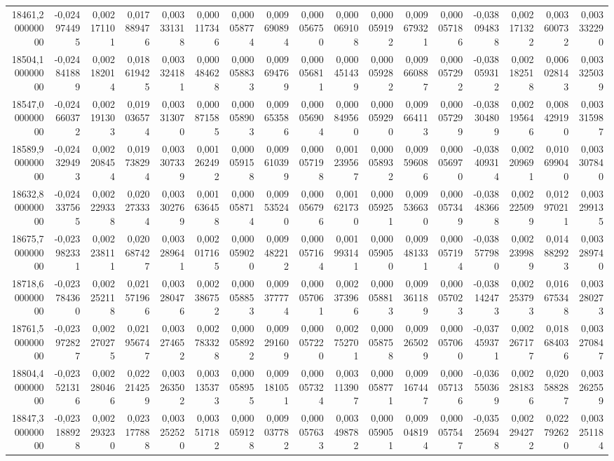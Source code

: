 \begin{longtable}{rrrrrrrrrrrrrrrrr}
18461,200000000 & -0,024974495 & 0,002171101 & 0,017889476 & 0,003331318 & 0,000117346 & 0,000058774 & 0,009690894 & 0,000056750 & 0,000069108 & 0,000059192 & 0,009679321 & 0,000057186 & -0,038094838 & 0,002171322 & 0,003600732 & 0,003332290\\
18504,100000000 & -0,024841889 & 0,002182014 & 0,018619425 & 0,003324181 & 0,000484628 & 0,000058833 & 0,009694769 & 0,000056811 & 0,000451439 & 0,000059282 & 0,009660887 & 0,000057292 & -0,038059312 & 0,002182518 & 0,006028143 & 0,003325039\\
18547,000000000 & -0,024660372 & 0,002191303 & 0,019036574 & 0,003313070 & 0,000871585 & 0,000058903 & 0,009653586 & 0,000056904 & 0,000849560 & 0,000059290 & 0,009664113 & 0,000057299 & -0,038304809 & 0,002195646 & 0,008429190 & 0,003315987\\
18589,900000000 & -0,024329493 & 0,002208454 & 0,019738294 & 0,003307339 & 0,001262492 & 0,000059158 & 0,009610399 & 0,000057198 & 0,001239567 & 0,000058932 & 0,009596086 & 0,000056970 & -0,038409314 & 0,002209691 & 0,010699040 & 0,003307840\\
18632,800000000 & -0,024337565 & 0,002229338 & 0,020273334 & 0,003302769 & 0,001636458 & 0,000058714 & 0,009535240 & 0,000056796 & 0,001621730 & 0,000059251 & 0,009536630 & 0,000057349 & -0,038483668 & 0,002225099 & 0,012970211 & 0,003299135\\
18675,700000000 & -0,023982331 & 0,002238111 & 0,020687427 & 0,003289641 & 0,002017165 & 0,000059020 & 0,009482212 & 0,000057164 & 0,001993141 & 0,000059050 & 0,009481331 & 0,000057194 & -0,038577980 & 0,002239989 & 0,014882923 & 0,003289740\\
18718,600000000 & -0,023784360 & 0,002252118 & 0,021571966 & 0,003280476 & 0,002386752 & 0,000058853 & 0,009377774 & 0,000057061 & 0,002373966 & 0,000058813 & 0,009361189 & 0,000057023 & -0,038142473 & 0,002253793 & 0,016675348 & 0,003280273\\
18761,500000000 & -0,023972827 & 0,002270275 & 0,021956747 & 0,003274652 & 0,002783328 & 0,000058922 & 0,009291609 & 0,000057220 & 0,002752701 & 0,000058758 & 0,009265029 & 0,000057060 & -0,037459371 & 0,002267177 & 0,018684036 & 0,003270847\\
18804,400000000 & -0,023521316 & 0,002280466 & 0,022214259 & 0,003263502 & 0,003135373 & 0,000058955 & 0,009181051 & 0,000057324 & 0,003113907 & 0,000058771 & 0,009167447 & 0,000057136 & -0,036550369 & 0,002281836 & 0,020588287 & 0,003262559\\
18847,300000000 & -0,023188928 & 0,002293230 & 0,023177888 & 0,003252520 & 0,003517182 & 0,000059128 & 0,009037782 & 0,000057633 & 0,003498782 & 0,000059051 & 0,009048194 & 0,000057547 & -0,035256948 & 0,002294272 & 0,022792620 & 0,003251184\\

\end{longtable}
